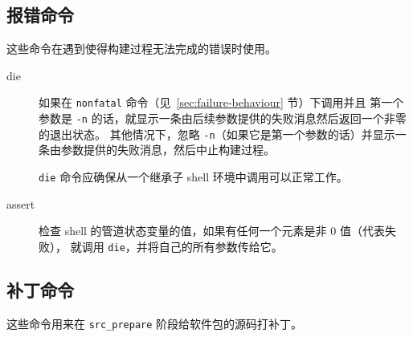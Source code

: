 \subsection{报错命令}
这些命令在遇到使得构建过程无法完成的错误时使用。
\begin{description}
\item[die] 如果在 \texttt{nonfatal} 命令（见~\ref{sec:failure-behaviour} 节）下调用并且
    第一个参数是 \texttt{-n} 的话，就显示一条由后续参数提供的失败消息然后返回一个非零的退出状态。
    其他情况下，忽略 \texttt{-n}（如果它是第一个参数的话）并显示一条由参数提供的失败消息，然后中止构建过程。

    \texttt{die} 命令应确保从一个继承子 shell 环境中调用可以正常工作。
\item[assert] 检查 shell 的管道状态变量的值，如果有任何一个元素是非 0 值（代表失败），
    就调用 \texttt{die}，并将自己的所有参数传给它。
\end{description}

\subsection{补丁命令}
这些命令用来在 \texttt{src_prepare} 阶段给软件包的源码打补丁。

